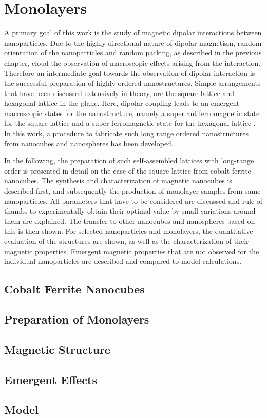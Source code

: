 \documentclass[\main/dresen_thesis.tex]{subfiles}
\renewcommand{\thisPath}{\main/chapters/monolayers}
\begin{document}
  \chapter{Monolayers}\label{ch:monolayers}
    A primary goal of this work is the study of magnetic dipolar interactions between nanoparticles.
    Due to the highly directional nature of dipolar magnetism, random orientation of the nanoparticles and random packing, as described in the previous chapter, cloud the observation of macroscopic effects arising from the interaction.
    Therefore an intermediate goal towards the observation of dipolar interaction is the successful preparation of highly ordered nanostructures.
    Simple arrangements that have been discussed extensively in theory, are the square lattice and hexagonal lattice in the plane.
    Here, dipolar coupling leads to an emergent macroscopic states for the nanostructure, namely a super antiferromagnetic state for the square lattice and a super ferromagnetic state for the hexagonal lattice \cite{Politi_2002_Dipol, Russier_2001_Calcu, Varon_2013_Dipol}.
    In this work, a procedure to fabricate such long range ordered nanostructures from nanocubes and nanospheres has been developed.

    In the following, the preparation of such self-assembled lattices with long-range order is presented in detail on the case of the square lattice from cobalt ferrite nanocubes.
    The synthesis and characterization of magnetic nanocubes is described first, and subsequently the production of monolayer samples from same nanoparticles.
    All parameters that have to be considered are discussed and rule of thumbs to experimentally obtain their optimal value by small variations around them are explained.
    The transfer to other nanocubes and nanospheres based on this is then shown.
    For selected nanoparticles and monolayers, the quantitative evaluation of the structures are shown, as well as the characterization of their magnetic properties. Emergent magnetic properties that are not observed for the individual nanoparticles are described and compared to model calculations.

    \section{Cobalt Ferrite Nanocubes}
      

    \FloatBarrier
    \section{Preparation of Monolayers}
      

    \FloatBarrier
    \section{Magnetic Structure}
      

    \section{Emergent Effects}

    \section{Model}
\end{document}

